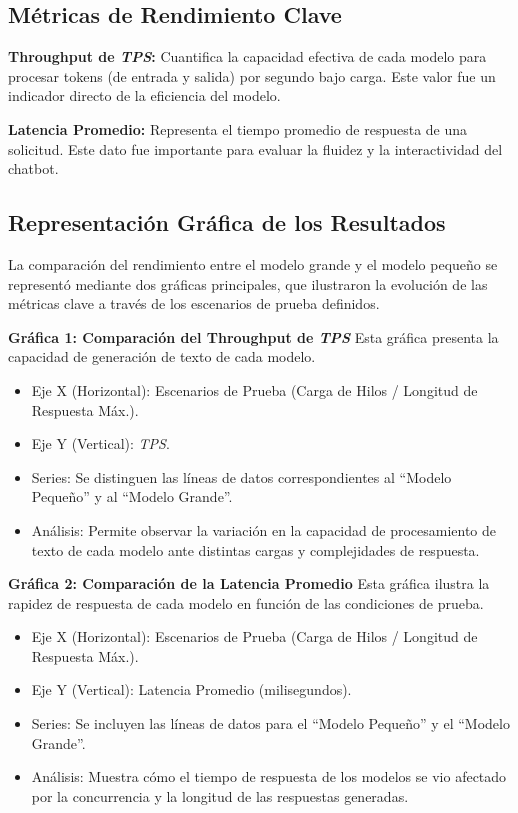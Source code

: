 \subsection*{Métricas de Rendimiento Clave}
\textbf{Throughput de \textit{TPS}:} Cuantifica la capacidad efectiva de cada modelo para procesar tokens (de entrada y salida) por segundo bajo carga. Este valor fue un indicador directo de la eficiencia del modelo.

\textbf{Latencia Promedio:} Representa el tiempo promedio de respuesta de una solicitud. Este dato fue importante para evaluar la fluidez y la interactividad del chatbot.

\subsection*{Representación Gráfica de los Resultados}
La comparación del rendimiento entre el modelo grande y el modelo pequeño se representó mediante dos gráficas principales, que ilustraron la evolución de las métricas clave a través de los escenarios de prueba definidos.

\textbf{Gráfica 1: Comparación del Throughput de \textit{TPS}}
Esta gráfica presenta la capacidad de generación de texto de cada modelo.
\begin{itemize}
    \item Eje X (Horizontal): Escenarios de Prueba (Carga de Hilos / Longitud de Respuesta Máx.).
    \item Eje Y (Vertical): \textit{TPS}.
    \item Series: Se distinguen las líneas de datos correspondientes al ``Modelo Pequeño'' y al ``Modelo Grande''.
    \item Análisis: Permite observar la variación en la capacidad de procesamiento de texto de cada modelo ante distintas cargas y complejidades de respuesta.
\end{itemize}

\textbf{Gráfica 2: Comparación de la Latencia Promedio}
Esta gráfica ilustra la rapidez de respuesta de cada modelo en función de las condiciones de prueba.
\begin{itemize}
    \item Eje X (Horizontal): Escenarios de Prueba (Carga de Hilos / Longitud de Respuesta Máx.).
    \item Eje Y (Vertical): Latencia Promedio (milisegundos).
    \item Series: Se incluyen las líneas de datos para el ``Modelo Pequeño'' y el ``Modelo Grande''.
    \item Análisis: Muestra cómo el tiempo de respuesta de los modelos se vio afectado por la concurrencia y la longitud de las respuestas generadas.
\end{itemize}

